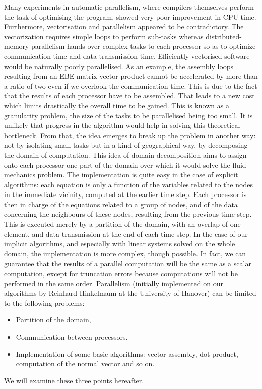 Many experiments in automatic parallelism, where compilers themselves perform
the task of optimising the program, showed very poor improvement in CPU time.
Furthermore, vectorisation and parallelism appeared to be contradictory.
The vectorization requires simple loops to perform sub-tasks whereas
distributed-memory parallelism hands over complex tasks to each processor so as
to optimize communication time and data transmission time. Efficiently
vectorised software would be naturally poorly parallelised. As an example, the
assembly loops resulting from an EBE matrix-vector product cannot be
accelerated by more than a ratio of two even if we overlook the communication
time. This is due to the fact that the results of each processor have to be
assembled. That leads to a new cost which limits drastically the overall time
to be gained. This is known as a granularity problem, the size of the tasks to
be parallelised being too small. It is unlikely that progress in the algorithm
would help in solving this theoretical bottleneck. From that, the idea emerges
to break up the problem in another way: not by isolating small tasks but in a
kind of geographical way, by decomposing the domain of computation. This idea
of domain decomposition aims to assign onto each processor one part of the
domain over which it would solve the fluid mechanics problem. The
implementation is quite easy in the case of explicit algorithms: each equation
is only a function of the variables related to the nodes in the immediate
vicinity, computed at the earlier time step. Each processor is then in charge
of the equations related to a group of nodes, and of the data concerning the
neighbours of these nodes, resulting from the previous time step. This is
executed merely by a partition of the domain, with an overlap of one element,
and data transmission at the end of each time step. In the case of our implicit
algorithms, and especially with linear systems solved on the whole domain, the
implementation is more complex, though possible. In fact, we can guarantee that
the results of a parallel computation will be the same as a scalar computation,
except for truncation errors because computations will not be performed in the
same order. Parallelism (initially implemented on our algorithms by Reinhard
Hinkelmann at the University of Hanover) can be limited to the following
problems:
\begin{itemize}
  \item Partition of the domain,
  \item Communication between processors.
  \item Implementation of some basic algorithms: vector assembly, dot product,
    computation of the normal vector and so on.
\end{itemize}
We will examine these three points hereafter.

